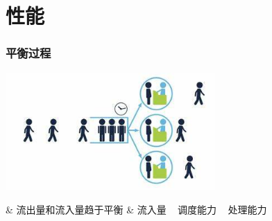 \documentclass[UTF8,8pt,xcolor=dvipsnames]{beamer}
\begin{document}
\section{性能}

\begin{frame}[fragile]
    \frametitle{平衡过程}
    \begin{center}
        \includegraphics[width=0.6\textwidth]{../imgs/queuing.jpeg}
    \end{center}

    \Activate
    \begin{tcolorbox}
        \begin{easylist}[itemize]
            & 流出量和流入量趋于平衡
            & 流入量 ~ 调度能力 ~ 处理能力
        \end{easylist}
    \end{tcolorbox}
    \Deactivate
\end{frame}
\end{document}
